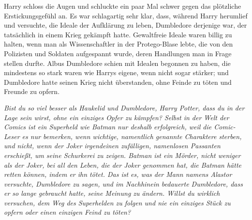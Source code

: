 Harry schloss die Augen und schluckte ein paar Mal schwer gegen das plötzliche Erstickungsgefühl an. Es war schlagartig sehr klar, dass, während Harry herumlief und versuchte, die Ideale der Aufklärung zu leben, Dumbledore derjenige war, der tatsächlich in einem Krieg gekämpft hatte. Gewaltfreie Ideale waren billig zu halten, wenn man als Wissenschaftler in der Protego-Blase lebte, die von den Polizisten und Soldaten aufgespannt wurde, deren Handlungen man in Frage stellen durfte. Albus Dumbledore schien mit Idealen begonnen zu haben, die mindestens so stark waren wie Harrys eigene, wenn nicht sogar stärker; und Dumbledore hatte seinen Krieg nicht überstanden, ohne Feinde zu töten und Freunde zu opfern.

\emph{Bist du so viel besser als Haukelid und Dumbledore, Harry Potter, dass du in der Lage sein wirst, ohne ein einziges Opfer zu kämpfen? Selbst in der Welt der Comics ist ein Superheld wie Batman nur deshalb erfolgreich, weil die Comic-Leser es nur bemerken, wenn wichtige, namentlich genannte Charaktere sterben, und nicht, wenn der Joker irgendeinen zufälligen, namenlosen Passanten erschießt, um seine Schurkerei zu zeigen. Batman ist ein Mörder, nicht weniger als der Joker, bei all den Leben, die der Joker genommen hat, die Batman hätte retten können, indem er ihn tötet. Das ist es, was der Mann namens Alastor versuchte, Dumbledore zu sagen, und im Nachhinein bedauerte Dumbledore, dass er so lange gebraucht hatte, seine Meinung zu ändern. Willst du wirklich versuchen, dem Weg des Superhelden zu folgen und nie ein einziges Stück zu opfern oder einen einzigen Feind zu töten?}

